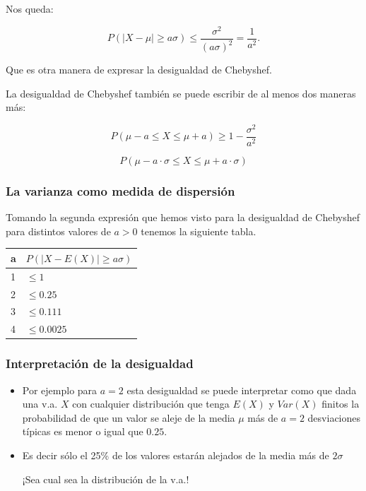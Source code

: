 \documentclass[handout]{beamer}\usepackage[]{graphicx}\usepackage[]{color}
\renewcommand{\emph}[1]{{\color{red}#1}}
\renewcommand{\leq}{\leqslant}
\renewcommand{\geq}{\geqslant}
\theoremstyle{plain}
\theoremstyle{definition}
\begin{document}

\begin{frame}

Nos queda:

$$P(|X-\mu|\geq a \sigma)\leq
\frac{\sigma^2}{(a\sigma)^2}=\frac{1}{a^2}.$$

Que es otra manera de expresar la desigualdad de Chebyshef.

La desigualdad de Chebyshef también se puede escribir de al menos dos maneras más:

$$P(\mu-a\leq X\leq \mu+a)\geq 1-\frac{\sigma^2}{a^2}$$

$$P(\mu-a\cdot \sigma\leq X\leq \mu+ a \cdot \sigma)$$
%
\end{frame}

\subsubsection{La varianza como medida de dispersión}
\begin{frame}
Tomando la segunda expresión que hemos visto para la desigualdad de
Chebyshef para distintos valores de $a>0$ tenemos la siguiente tabla.
\begin{center}
\begin{tabular}{l|l}
a & $P(|X-E(X)|\geq a \sigma)$\\
\hline
1 & $\leq 1$ \\
2 & $\leq 0.25$ \\
3 & $\leq 0.111$ \\
4 & $\leq 0.0025$
\end{tabular}
\end{center}

\end{frame}

\begin{frame}[fragile]
\frametitle{Interpretación de la desigualdad}
\begin{itemize}
\item Por ejemplo para $a=2$ esta desigualdad se puede interpretar como 
que dada una v.a. $X$ con cualquier distribución
que tenga $E(X)$ y $Var(X)$ finitos
\emph{la  probabilidad de que un valor se aleje de la media $\mu$ más de
$a=2$ desviaciones típicas es menor o igual que $0.25$}.
\item Es decir sólo el 25\% de los valores estarán alejados de la media
más de $2\sigma$

¡\emph{Sea cual sea la distribución de la v.a.}!
\end{itemize}
\end{frame}
\end{document}
